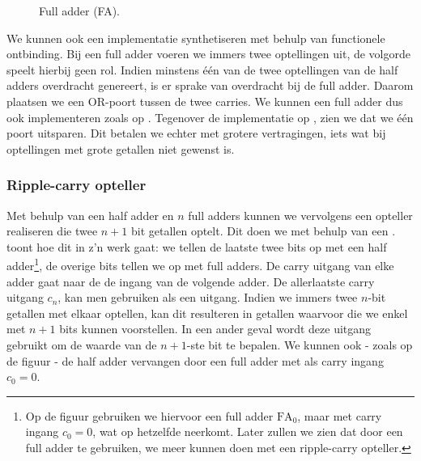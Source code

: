 \begin{figure}[hbt]
\centering
{}
\caption{Full adder (FA).}
\end{figure}

We kunnen ook een implementatie synthetiseren met behulp van functionele ontbinding. Bij een full adder voeren we immers twee optellingen uit, de volgorde speelt hierbij geen rol. Indien minstens \'e\'en van de twee optellingen van de half adders overdracht genereert, is er sprake van overdracht bij de full adder. Daarom plaatsen we een OR-poort tussen de twee carries. We kunnen een full adder dus ook implementeren zoals op . Tegenover de implementatie op , zien we dat we \'e\'en poort uitsparen. Dit betalen we echter met grotere vertragingen, iets wat bij optellingen met grote getallen niet gewenst is.

\subsubsection{Ripple-carry opteller}
Met behulp van een half adder en $n$ full adders kunnen we vervolgens een opteller realiseren die twee $n+1$ bit getallen optelt. Dit doen we met behulp van een .
 toont hoe dit in z'n werk gaat: we tellen de laatste twee bits op met een half adder\footnote{Op de figuur gebruiken we hiervoor een full adder $\mbox{FA}_0$, maar met carry ingang $c_0=0$, wat op hetzelfde neerkomt. Later zullen we zien dat door een full adder te gebruiken, we meer kunnen doen met een ripple-carry opteller.}, de overige bits tellen we op met full adders. De carry uitgang van elke adder gaat naar de de ingang van de volgende adder. De allerlaatste carry uitgang $c_n$, kan men gebruiken als een  uitgang. Indien we immers twee $n$-bit getallen met elkaar optellen, kan dit resulteren in getallen waarvoor die we enkel met $n+1$ bits kunnen voorstellen. In een ander geval wordt deze uitgang gebruikt om de waarde van de $n+1$-ste bit te bepalen. We kunnen ook - zoals op de figuur - de half adder vervangen door een full adder met als carry ingang $c_0=0$.

